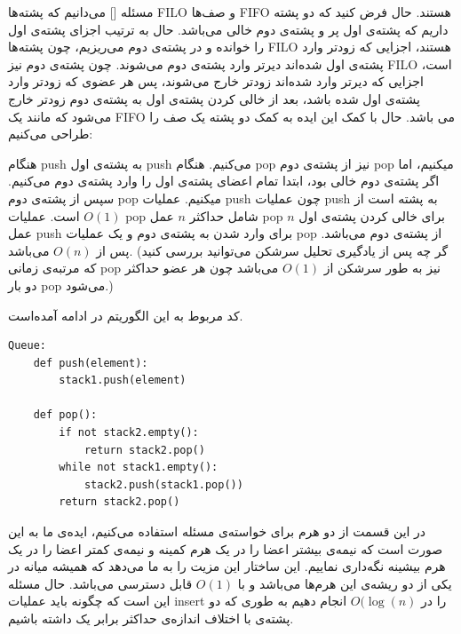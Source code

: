 
‌مسئله []
می‌دانیم که پشته‌ها FILO و صف‌ها FIFO هستند. حال فرض کنید که دو پشته داریم که پشته‌ی اول پر و پشته‌ی دوم خالی می‌باشد. حال به ترتیب اجزای پشته‌ی اول را خوانده و در پشته‌ی دوم می‌ریزیم، چون پشته‌ها FILO هستند، اجزایی که زودتر وارد پشته‌ی اول شده‌اند دیرتر وارد پشته‌ی دوم می‌شوند. چون پشته‌ی دوم نیز FILO است، اجزایی که دیرتر وارد شده‌اند زودتر خارج می‌شوند، پس هر عضوی که زودتر وارد پشته‌ی اول شده باشد، بعد از خالی کردن پشته‌ی اول به پشته‌ی دوم زودتر خارج می‌شود که مانند یک FIFO می باشد. حال با کمک این ایده به کمک دو پشته یک صف را طراحی می‌کنیم:

هنگام push به پشته‌ی اول push می‌کنیم. هنگام pop نیز از پشته‌ی دوم pop میکنیم، اما اگر پشته‌ی دوم خالی بود، ابتدا تمام اعضای پشته‌ی اول را وارد پشته‌ی دوم می‌کنیم. سپس از پشته‌ی دوم pop میکنیم. عملیات push چون عملیات push به پشته است از 
$O(1)$
است. عملیات pop شامل حداکثر $n$ عمل pop برای خالی کردن پشته‌ی اول $n$ عمل push برای وارد شدن به پشته‌ی دوم و یک عملیات pop از پشته‌ی دوم می‌باشد. پس از
$O(n)$
می‌باشد. (گر چه پس از یادگیری تحلیل سرشکن می‌توانید بررسی کنید که مرتبه‌ی زمانی pop نیز به طور سرشکن از
$O(1)$
می‌باشد چون هر عضو حداکثر دو بار pop می‌شود.)

کد مربوط به این الگوریتم در ادامه آمده‌است.

\begin{latin}
\begin{lstlisting}
Queue:
	def push(element):
		stack1.push(element)
	
	def pop():
		if not stack2.empty():
			return stack2.pop()
		while not stack1.empty():
			stack2.push(stack1.pop())
		return stack2.pop()
\end{lstlisting}
\end{latin}


در این قسمت از دو هرم برای خواسته‌ی مسئله استفاده می‌کنیم، ایده‌ی ما به این صورت است که نیمه‌ی بیشتر اعضا را در یک هرم کمینه و نیمه‌ی کمتر اعضا را در یک هرم بیشینه نگه‌داری نماییم.   این ساختار این مزیت را به ما می‌د‌هد که همیشه میانه در یکی از دو ریشه‌ی این هرم‌ها می‌باشد و با
$O(1)$
قابل دسترسی می‌باشد. حال مسئله این است که چگونه باید عملیات insert را در
$O(\log(n)$
انجام دهیم به طوری که دو پشته‌ی با اختلاف اندازه‌ی حداکثر برابر یک داشته باشیم.

